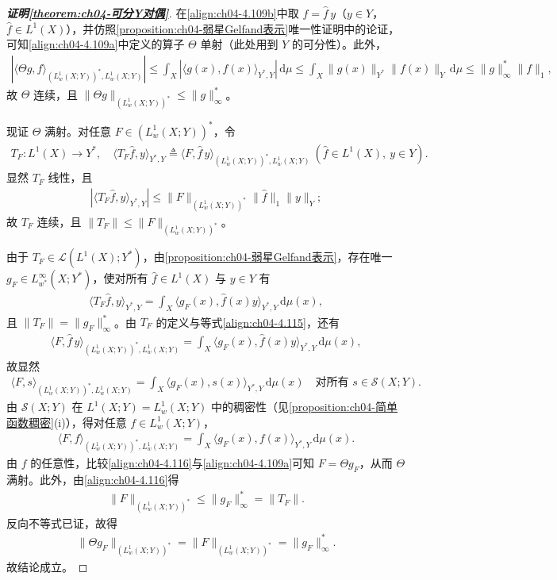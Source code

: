 \documentclass[../../main.tex]{subfiles}%
\begin{document}
\begin{proof}[\textbf{证明\cref{theorem:ch04-可分Y对偶}}]
在\eqref{align:ch04-4.109b}中取 $f=\hat f\,y$（$y\in Y$，$\hat f\in L^1(X)$），并仿照\cref{proposition:ch04-弱星Gelfand表示}唯一性证明中的论证，可知\eqref{align:ch04-4.109a}中定义的算子 $\Theta$ 单射（此处用到 $Y$ 的可分性）。此外，
\begin{align*}
|\langle\Theta g,f\rangle_{(L^1_w(X;Y))^*,L^1_w(X;Y)}|
\leqslant\int_X|\langle g(x),f(x)\rangle_{Y^*,Y}|\,\mathrm{d}\mu
\leqslant\int_X\|g(x)\|_{Y^*}\|f(x)\|_Y\,\mathrm{d}\mu
\leqslant\|g\|_\infty^*\|f\|_1,
\end{align*}
故 $\Theta$ 连续，且 $\|\Theta g\|_{(L^1_w(X;Y))^*}\leqslant\|g\|_\infty^*$。

现证 $\Theta$ 满射。对任意 $F\in(L^1_w(X;Y))^*$，令
\begin{align*}
T_F:L^1(X)\to Y^*,\quad \langle T_F\hat f,y\rangle_{Y^*,Y}\triangleq \langle F,\hat f\,y\rangle_{(L^1_w(X;Y))^*,L^1_w(X;Y)}\ (\hat f\in L^1(X),\ y\in Y).
\end{align*}
显然 $T_F$ 线性，且
\begin{align*}
|\langle T_F\hat f,y\rangle_{Y^*,Y}|\leqslant\|F\|_{(L^1_w(X;Y))^*}\|\hat f\|_1\|y\|_Y;
\end{align*}
故 $T_F$ 连续，且 $\|T_F\|\leqslant\|F\|_{(L^1_w(X;Y))^*}$。

由于 $T_F\in\mathcal{L}(L^1(X);Y^*)$，由\cref{proposition:ch04-弱星Gelfand表示}，存在唯一 $g_F\in L^\infty_{w^*}(X;Y^*)$，使对所有 $\hat f\in L^1(X)$ 与 $y\in Y$ 有
\begin{align}
\langle T_F\hat f,y\rangle_{Y^*,Y}=\int_X\langle g_F(x),\hat f(x)y\rangle_{Y^*,Y}\,\mathrm{d}\mu(x), \label{align:ch04-4.115}
\end{align}
且 $\|T_F\|=\|g_F\|_\infty^*$。由 $T_F$ 的定义与等式\eqref{align:ch04-4.115}，还有
\begin{align*}
\langle F,\hat f\,y\rangle_{(L^1_w(X;Y))^*,L^1_w(X;Y)}=\int_X\langle g_F(x),\hat f(x)y\rangle_{Y^*,Y}\,\mathrm{d}\mu(x),
\end{align*}
故显然
\begin{align*}
\langle F,s\rangle_{(L^1_w(X;Y))^*,L^1_w(X;Y)}=\int_X\langle g_F(x),s(x)\rangle_{Y^*,Y}\,\mathrm{d}\mu(x)\quad\text{对所有 }s\in\mathcal{S}(X;Y).
\end{align*}
由 $\mathcal{S}(X;Y)$ 在 $L^1(X;Y)=L^1_w(X;Y)$ 中的稠密性（见\cref{proposition:ch04-简单函数稠密}(i)），得对任意 $f\in L^1_w(X;Y)$，
\begin{align}
\langle F,f\rangle_{(L^1_w(X;Y))^*,L^1_w(X;Y)}=\int_X\langle g_F(x),f(x)\rangle_{Y^*,Y}\,\mathrm{d}\mu(x). \label{align:ch04-4.116}
\end{align}
由 $f$ 的任意性，比较\eqref{align:ch04-4.116}与\eqref{align:ch04-4.109a}可知 $F=\Theta g_F$，从而 $\Theta$ 满射。此外，由\eqref{align:ch04-4.116}得
\begin{align*}
\|F\|_{(L^1_w(X;Y))^*}\leqslant\|g_F\|_\infty^*=\|T_F\|.
\end{align*}
反向不等式已证，故得
\begin{align*}
\|\Theta g_F\|_{(L^1_w(X;Y))^*}=\|F\|_{(L^1_w(X;Y))^*}=\|g_F\|_\infty^*.
\end{align*}
故结论成立。
\end{proof}
\end{document}
